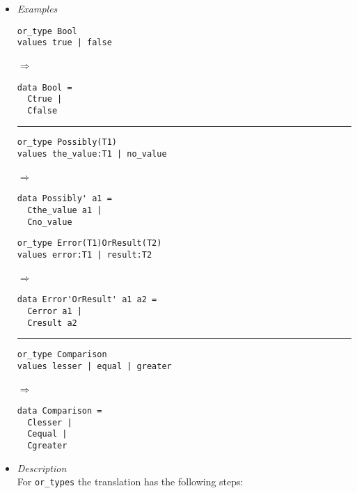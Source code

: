\documentclass{article}
\def\lra{$\Longrightarrow$\ }
\begin{document}
\begin{itemize}

\item
\textit{Examples}

\begin{minipage}[t][8cm][t]{\linewidth}
\begin{minipage}{0.35\linewidth}
\begin{verbatim}
or_type Bool
values true | false
\end{verbatim}
\lra
\begin{verbatim}
data Bool =
  Ctrue |
  Cfalse
\end{verbatim}

\rule{\linewidth}{0.1pt}

\begin{verbatim}
or_type Possibly(T1)
values the_value:T1 | no_value
\end{verbatim}
\lra
\begin{verbatim}
data Possibly' a1 =
  Cthe_value a1 |
  Cno_value
\end{verbatim}

\end{minipage}
\hfill\vline\hfill
\begin{minipage}{0.45\linewidth}

\begin{verbatim}
or_type Error(T1)OrResult(T2)
values error:T1 | result:T2
\end{verbatim}
\lra
\begin{verbatim}
data Error'OrResult' a1 a2 =
  Cerror a1 |
  Cresult a2
\end{verbatim}

\rule{\linewidth}{0.1pt}

\begin{verbatim}
or_type Comparison
values lesser | equal | greater
\end{verbatim}
\lra
\begin{verbatim}
data Comparison =
  Clesser |
  Cequal |
  Cgreater
\end{verbatim}

\end{minipage}

\end{minipage}

\item
\textit{Description}\\

For \verb|or_types| the translation has the following steps:

\begin{enumerate}


\end{enumerate}
\end{itemize}
\end{document}
